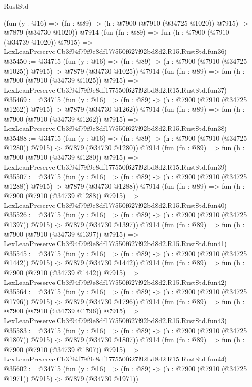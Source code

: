 \begin{lexlean}{RustStd}
\begin{coremodule}
    (fun (y : @16) =>
    (fn : @89) -> (h : @7900 (@7910 (@34725 @1020)) @7915) -> @7879 (@34730 @1020))
    @7914
    (fun (fn : @89) =>
    fun (h : @7900 (@7910 (@34739 @1020)) @7915) =>
    LexLeanPreserve.Cb3f94f79f9e8df177550f627f92bd8d2.R15.RustStd.fun36)
@35450 := @34715
    (fun (y : @16) =>
    (fn : @89) -> (h : @7900 (@7910 (@34725 @1025)) @7915) -> @7879 (@34730 @1025))
    @7914
    (fun (fn : @89) =>
    fun (h : @7900 (@7910 (@34739 @1025)) @7915) =>
    LexLeanPreserve.Cb3f94f79f9e8df177550f627f92bd8d2.R15.RustStd.fun37)
@35469 := @34715
    (fun (y : @16) =>
    (fn : @89) -> (h : @7900 (@7910 (@34725 @1262)) @7915) -> @7879 (@34730 @1262))
    @7914
    (fun (fn : @89) =>
    fun (h : @7900 (@7910 (@34739 @1262)) @7915) =>
    LexLeanPreserve.Cb3f94f79f9e8df177550f627f92bd8d2.R15.RustStd.fun38)
@35488 := @34715
    (fun (y : @16) =>
    (fn : @89) -> (h : @7900 (@7910 (@34725 @1280)) @7915) -> @7879 (@34730 @1280))
    @7914
    (fun (fn : @89) =>
    fun (h : @7900 (@7910 (@34739 @1280)) @7915) =>
    LexLeanPreserve.Cb3f94f79f9e8df177550f627f92bd8d2.R15.RustStd.fun39)
@35507 := @34715
    (fun (y : @16) =>
    (fn : @89) -> (h : @7900 (@7910 (@34725 @1288)) @7915) -> @7879 (@34730 @1288))
    @7914
    (fun (fn : @89) =>
    fun (h : @7900 (@7910 (@34739 @1288)) @7915) =>
    LexLeanPreserve.Cb3f94f79f9e8df177550f627f92bd8d2.R15.RustStd.fun40)
@35526 := @34715
    (fun (y : @16) =>
    (fn : @89) -> (h : @7900 (@7910 (@34725 @1397)) @7915) -> @7879 (@34730 @1397))
    @7914
    (fun (fn : @89) =>
    fun (h : @7900 (@7910 (@34739 @1397)) @7915) =>
    LexLeanPreserve.Cb3f94f79f9e8df177550f627f92bd8d2.R15.RustStd.fun41)
@35545 := @34715
    (fun (y : @16) =>
    (fn : @89) -> (h : @7900 (@7910 (@34725 @1442)) @7915) -> @7879 (@34730 @1442))
    @7914
    (fun (fn : @89) =>
    fun (h : @7900 (@7910 (@34739 @1442)) @7915) =>
    LexLeanPreserve.Cb3f94f79f9e8df177550f627f92bd8d2.R15.RustStd.fun42)
@35564 := @34715
    (fun (y : @16) =>
    (fn : @89) -> (h : @7900 (@7910 (@34725 @1796)) @7915) -> @7879 (@34730 @1796))
    @7914
    (fun (fn : @89) =>
    fun (h : @7900 (@7910 (@34739 @1796)) @7915) =>
    LexLeanPreserve.Cb3f94f79f9e8df177550f627f92bd8d2.R15.RustStd.fun43)
@35583 := @34715
    (fun (y : @16) =>
    (fn : @89) -> (h : @7900 (@7910 (@34725 @1807)) @7915) -> @7879 (@34730 @1807))
    @7914
    (fun (fn : @89) =>
    fun (h : @7900 (@7910 (@34739 @1807)) @7915) =>
    LexLeanPreserve.Cb3f94f79f9e8df177550f627f92bd8d2.R15.RustStd.fun44)
@35602 := @34715
    (fun (y : @16) =>
    (fn : @89) -> (h : @7900 (@7910 (@34725 @1971)) @7915) -> @7879 (@34730 @1971))

\end{coremodule}
\end{lexlean}
